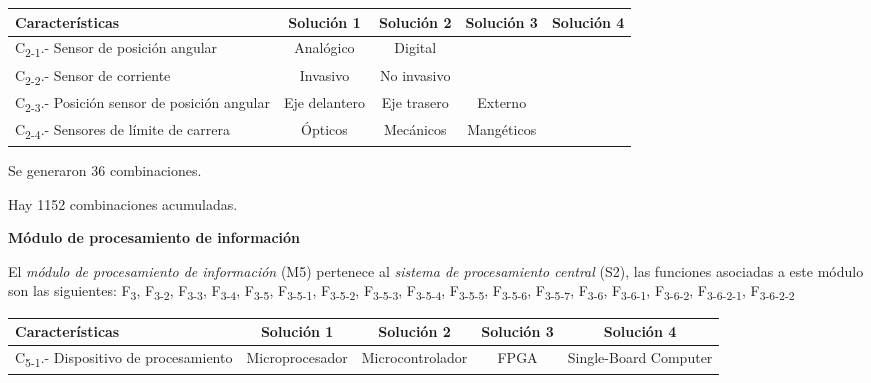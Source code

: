 \begin{center}
\begin{adjustbox}{angle=90}
\begin{tabular}{|l|c|c|c|c|}
\hline
\textbf{Caracter\'isticas} &
 \textbf{Soluci\'on 1} &
 \textbf{Soluci\'on 2} &
 \textbf{Soluci\'on 3} &
 \textbf{Soluci\'on 4}\\\hline
C\textsubscript{2-1}.- Sensor de posici\'on angular &
 Anal\'ogico &
 Digital &
   &
 \\\hline
C\textsubscript{2-2}.- Sensor de corriente &
 Invasivo &
 No invasivo &
   &
 \\\hline
C\textsubscript{2-3}.- Posici\'on sensor de posici\'on angular &
 Eje delantero &
 Eje trasero &
 Externo &
 \\\hline
C\textsubscript{2-4}.- Sensores de l\'imite de carrera &
 \'Opticos &
 Mec\'anicos &
 Mang\'eticos &
 \\\hline
\end{tabular}
\end{adjustbox}
\end{center}

\par Se generaron 36 combinaciones.\par
Hay 1152 combinaciones acumuladas.

\textbf{M\'odulo de procesamiento de informaci\'on}

El \textit{m\'odulo de procesamiento de informaci\'on} (M5) pertenece al \textit{sistema de procesamiento central} (S2), las funciones asociadas a este m\'odulo son las siguientes: F\textsubscript{3}, F\textsubscript{3-2}, F\textsubscript{3-3}, F\textsubscript{3-4}, F\textsubscript{3-5}, F\textsubscript{3-5-1}, F\textsubscript{3-5-2}, F\textsubscript{3-5-3}, F\textsubscript{3-5-4}, F\textsubscript{3-5-5}, F\textsubscript{3-5-6}, F\textsubscript{3-5-7}, F\textsubscript{3-6}, F\textsubscript{3-6-1}, F\textsubscript{3-6-2}, F\textsubscript{3-6-2-1}, F\textsubscript{3-6-2-2}

\begin{center}
\begin{adjustbox}{angle=90}
\begin{tabular}{|l|c|c|c|c|}
\hline
\textbf{Caracter\'isticas} &
 \textbf{Soluci\'on 1} &
 \textbf{Soluci\'on 2} &
 \textbf{Soluci\'on 3} &
 \textbf{Soluci\'on 4}\\\hline
C\textsubscript{5-1}.- Dispositivo de procesamiento &
 Microprocesador &
 Microcontrolador &
 FPGA &
 Single-Board Computer\\\hline
\end{tabular}

\end{adjustbox}
\end{center}

